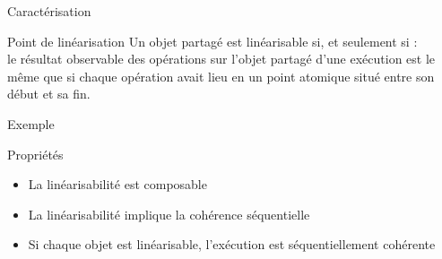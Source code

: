 
\begingroup

\begin{frame}{Caractérisation}

  \begin{block}{Point de linéarisation}
    Un objet partagé est linéarisable si, et seulement si : \\
    le résultat observable des opérations sur l'objet partagé d'une exécution est le même que si
    \alert{chaque opération avait lieu en un point atomique
      situé entre son début et sa fin.}
  \end{block}

  \vfill
  \begin{exampleblock}{Exemple}

    \begin{center}
    \end{center}
  \end{exampleblock}

  \vfill
  \small
  \begin{alertblock}{Propriétés}
    \vspace{-2mm}
    \begin{itemize}
    \item La linéarisabilité est composable
    \item La linéarisabilité implique la cohérence séquentielle
    \item Si chaque objet est linéarisable, l'exécution est séquentiellement cohérente
    \end{itemize}
  \end{alertblock}
\end{frame}

\endgroup
\endinput
